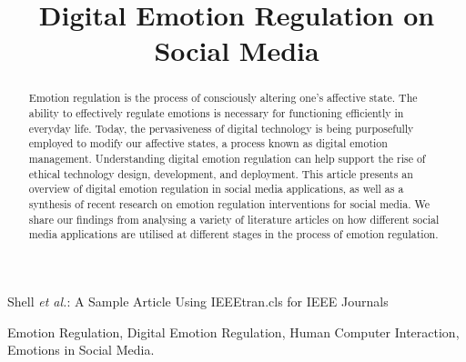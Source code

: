\documentclass[lettersize,journal]{IEEEtran}
\begin{document}
\title{Digital Emotion Regulation on Social Media}


%
{Shell \MakeLowercase{\textit{et al.}}: A Sample Article Using IEEEtran.cls for IEEE Journals}


\maketitle

\begin{abstract}
Emotion regulation is the process of consciously altering one's affective state. The ability to effectively regulate emotions is necessary for functioning efficiently in everyday life. Today, the pervasiveness of digital technology is being purposefully employed to modify our affective states, a process known as digital emotion management. Understanding digital emotion regulation can help support the rise of ethical technology design, development, and deployment. This article presents an overview of digital emotion regulation in social media applications, as well as a synthesis of recent research on emotion regulation interventions for social media. We share our findings from analysing a variety of literature articles on how different social media applications are utilised at different stages in the process of emotion regulation.
\end{abstract}

\begin{IEEEkeywords}
Emotion Regulation, Digital Emotion Regulation, Human Computer Interaction, Emotions in Social Media.
\end{IEEEkeywords}
\end{document}
